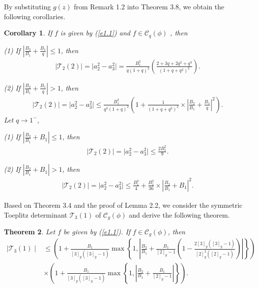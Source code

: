 \documentclass[11pt,twoside, reqno]{article}
\newtheorem{theorem}{Theorem}[section]
\newtheorem{corollary}[theorem]{Corollary}
\theoremstyle{definition}
\begin{document}
By substituting $g(z)$ from Remark 1.2 into Theorem 3.8, we obtain the following corollaries.
\begin{corollary}
If $f$ is given by (\ref{e1.1}) and $f\in\mathcal{C}_{q}(\phi)$ , then

(1) If $|\frac{B_{2}}{B_{1}}+\frac{B_{1}}{q}|\leq1$, then
\begin{align}\nonumber
\mid \mathcal{T}_2(2)\mid=\mid a_{2}^2-a_{3}^{2}\mid=
\frac{B_{1}^{2}}{q(1+q)^{2}}\left(\frac{2+3q+2q^{2}+q^{3}}{(1+q+q^{2})^{2}}\right).
\end{align}

(2) If $|\frac{B_{2}}{B_{1}}+\frac{B_{1}}{q}|>1$, then
\begin{align}\nonumber
\mid \mathcal{T}_2(2)\mid=\mid a_{2}^2-a_{3}^{2}\mid\leq
\frac{B_{1}^{2}}{q^{2}(1+q)^{2}}\left(1+\frac{1}{(1+q+q^{2})^{2}}
\times\left|\frac{B_{2}}{B_{1}}+\frac{B_{1}}{q}\right|^{2}\right).
\end{align}
Let $q\rightarrow1^{-}$,

(1) If $|\frac{B_{2}}{B_{1}}+B_{1}|\leq1$, then
\begin{align}\nonumber
\mid \mathcal{T}_2(2)\mid=\mid a_{2}^2-a_{3}^{2}\mid\leq
\frac{2B_{1}^{2}}{9}.
\end{align}

(2) If $|\frac{B_{2}}{B_{1}}+B_{1}|>1$, then
\begin{align}\nonumber
\mid \mathcal{T}_2(2)\mid=\mid a_{2}^2-a_{3}^{2}\mid\leq
\frac{B_{1}^{2}}{4}+\frac{B_{1}^{2}}{36}
\times\left|\frac{B_{2}}{B_{1}}+B_{1}\right|^{2}.
\end{align}
\end{corollary}
Based on Theorem 3.4 and the proof of Lemma 2.2, we consider the symmetric Toeplitz determinant $\mathcal{T}_3(1)$ of $\mathcal{C}_{g}(\phi)$ and derive the following theorem.
\begin{theorem}
Let $f$ be given by (\ref{e1.1}). If $f\in\mathcal{C}_{g}(\phi)$, then
\begin{align}\nonumber
\mid \mathcal{T}_3(1)\mid &\leq \left(1+\frac{B_{1}}{[3]_{g}([3]_{g}-1)}\max\left\{1,\left|\frac{B_{2}}{B_{1}}+
\frac{B_{1}}{[2]_{g}-1}\left(1-\frac{2[3]_{g}([3]_{g}-1)}{[2]_{g}^{2}([2]_{g}-1)}\right)\right|\right\}\right)\\\nonumber
&\times\left(1+\frac{B_{1}}{[3]_{g}([3]_{g}-1)}\max\left\{1, \left|\frac{B_{2}}{B_{1}}+\frac{B_{1}}{[2]_{g}-1}\right|\right\}\right).
\end{align}
\end{theorem}
\end{document}
